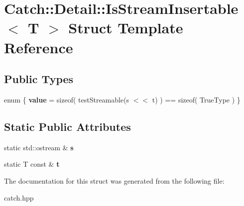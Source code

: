 \hypertarget{structCatch_1_1Detail_1_1IsStreamInsertable}{}\section{Catch\+:\+:Detail\+:\+:Is\+Stream\+Insertable$<$ T $>$ Struct Template Reference}
\label{structCatch_1_1Detail_1_1IsStreamInsertable}
\subsection*{Public Types}
\begin{DoxyCompactItemize}
\item 
\mbox{\label{structCatch_1_1Detail_1_1IsStreamInsertable_a2e4508694da3bf368ff67733a7970edd}} 
enum \{ {\bfseries value} = sizeof( test\+Streamable(s $<$$<$ t) ) == sizeof( True\+Type )
 \}
\end{DoxyCompactItemize}
\subsection*{Static Public Attributes}
\begin{DoxyCompactItemize}
\item 
\mbox{\label{structCatch_1_1Detail_1_1IsStreamInsertable_abe3d3c8e5d85665747faafffc9a96b00}} 
static std\+::ostream \& {\bfseries s}
\item 
\mbox{\label{structCatch_1_1Detail_1_1IsStreamInsertable_a7d2a3da978b6736667a7b2f6d51f507f}} 
static T const  \& {\bfseries t}
\end{DoxyCompactItemize}


The documentation for this struct was generated from the following file\+:\begin{DoxyCompactItemize}
\item 
catch.\+hpp\end{DoxyCompactItemize}
